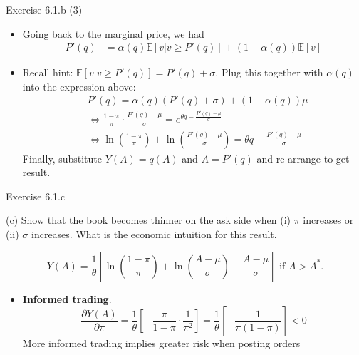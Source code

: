 \documentclass[english,10pt
,aspectratio=169
]{beamer}
\begin{document}
\begin{frame}{Exercise 6.1.b (3)}
	\begin{itemize}
		\item Going back to the marginal price, we had
		\begin{align*}
			P'(q) &= \alpha(q) \mathbb{E}[v|v \ge P'(q)]+(1-\alpha(q))\mathbb{E}[v]
		\end{align*}
		\item Recall hint: $\mathbb{E}[v|v \ge P'(q)]=P'(q)+\sigma$. Plug this together with $\alpha(q)$ into the expression above:
		\begin{align*}
			&P'(q) = \alpha(q) (P'(q)+\sigma) + (1-\alpha(q)) \mu 
			\\
			& \Leftrightarrow \frac{1-\pi}{\pi} \cdot \frac{P'(q)-\mu}{\sigma} = e^{\theta q - \frac{P'(q)-\mu}{\sigma}}  \\
			& \Leftrightarrow \ln \left( \frac{1-\pi}{\pi} \right) + \ln \left( \frac{P'(q)-\mu}{\sigma} \right) = \theta q - \frac{P'(q)-\mu}{\sigma} 
		\end{align*}
		Finally, substitute $Y(A)=q(A)$ and $A=P'(q)$ and re-arrange to get result.
	\end{itemize}
\end{frame}


\begin{frame}{Exercise 6.1.c}
	\begin{exampleblock}{}
		(c) Show that the book becomes thinner on the ask side when (i) $\pi$ increases or (ii) $\sigma$ increases. What is the economic intuition for this result.
	\end{exampleblock}

	\pause

	$$
		Y(A)=\frac{1}{\theta} \left[\ln \left(\frac{1-\pi}{\pi}\right) + \ln \left(\frac{A-\mu}{\sigma}\right) + \frac{A-\mu}{\sigma}\right]\text{ if } A>A^*.
	$$
	\begin{itemize}
		\item \textbf{Informed trading}. 
		\[
		\frac{\partial Y(A)}{\partial \pi} = \frac{1}{\theta}\left[ -\frac{\pi}{1-\pi}\cdot \frac{1}{\pi^2}\right]=\frac{1}{\theta}\left[ -\frac{1}{\pi(1-\pi)}\right]<0
		\]
		More informed trading implies greater risk when posting orders
	\end{itemize}
\end{frame}
\end{document}
